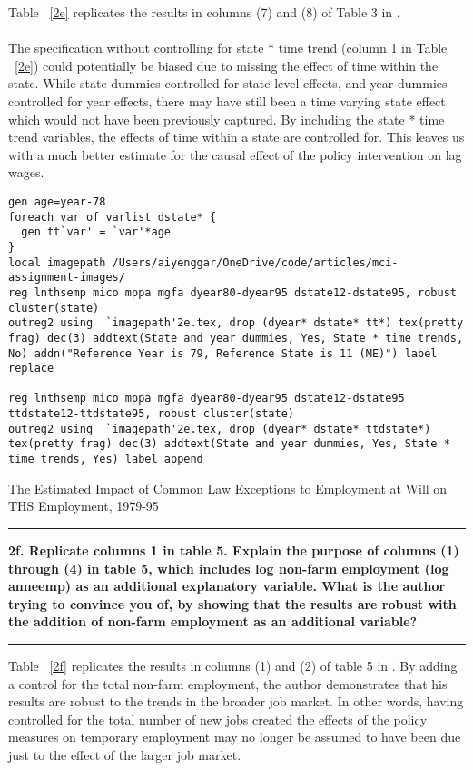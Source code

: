 \documentclass[12pt]{article}
\newcommand\question[1]{\vspace{1em}\hrule\vspace{1em}\textbf{#1}\vspace{1em}\hrule\vspace{1em}}
\begin{document}
\noindent Table ~\ref{2e} replicates the results in columns (7) and (8) of Table 3 in \cite{Autor2003}. \\\\The specification without controlling for state * time trend (column 1 in Table ~\ref{2e}) could potentially be biased due to missing the effect of time within the state. While state dummies controlled for state level effects, and year dummies controlled for year effects, there may have still been a time varying state effect which would not have been previously captured. By including the state * time trend variables, the effects of time within a state are controlled for. This leaves us with a much better estimate for the causal effect of the policy intervention on lag wages.
 
\begin{lstlisting}
gen age=year-78
foreach var of varlist dstate* {
  gen tt`var' = `var'*age
}
local imagepath /Users/aiyenggar/OneDrive/code/articles/mci-assignment-images/
reg lnthsemp mico mppa mgfa dyear80-dyear95 dstate12-dstate95, robust cluster(state)
outreg2 using  `imagepath'2e.tex, drop (dyear* dstate* tt*) tex(pretty frag) dec(3) addtext(State and year dummies, Yes, State * time trends, No) addn("Reference Year is 79, Reference State is 11 (ME)") label replace

reg lnthsemp mico mppa mgfa dyear80-dyear95 dstate12-dstate95 ttdstate12-ttdstate95, robust cluster(state)
outreg2 using  `imagepath'2e.tex, drop (dyear* dstate* ttdstate*) tex(pretty frag) dec(3) addtext(State and year dummies, Yes, State * time trends, Yes) label append
\end{lstlisting}

\begin{table}
\caption{The Estimated Impact of Common Law Exceptions to Employment at Will on THS Employment, 1979-95}

\label{2e}
\end{table}

\newpage
\question{2f. Replicate columns 1 in table 5. Explain the purpose of columns (1) through (4) in table 5, which includes log non-farm employment (log anneemp) as an additional explanatory variable. What is the author trying to convince you of, by showing that the results are robust with the addition of non-farm employment as an additional variable?}
\noindent Table ~\ref{2f} replicates the results in columns (1) and (2) of table 5 in \cite{Autor2003}. By adding a control for the total non-farm employment, the author demonstrates that his results are robust to the trends in the broader job market. In other words, having controlled for the total number of new jobs created the effects of the policy measures on temporary employment may no longer be assumed to have been due just to the effect of the larger job market.
\end{document}
